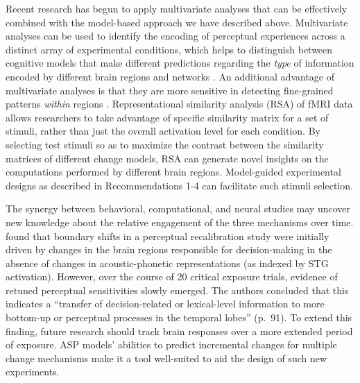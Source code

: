 \documentclass[
  11pt,
  man,floatsintext]{apa6}
\begin{document}
Recent research has begun to apply multivariate analyses that can be effectively combined with the model-based approach we have described above. Multivariate analyses can be used to identify the encoding of perceptual experiences across a distinct array of experimental conditions, which helps to distinguish between cognitive models that make different predictions regarding the \emph{type} of information encoded by different brain regions and networks \autocite[e.g.,][]{blank2016}. An additional advantage of multivariate analyses is that they are more sensitive in detecting fine-grained patterns \emph{within} regions \autocites[e.g.,][]{bonte2017,luthra2020a}. Representational similarity analysis (RSA) of fMRI data allows researchers to take advantage of specific similarity matrix for a set of stimuli, rather than just the overall activation level for each condition. By selecting test stimuli so as to maximize the contrast between the similarity matrices of different change models, RSA can generate novel insights on the computations performed by different brain regions. Model-guided experimental designs as described in Recommendations 1-4 can facilitate such stimuli selection.

The synergy between behavioral, computational, and neural studies may uncover new knowledge about the relative engagement of the three mechanisms over time. \textcite{myers-mesite2014} found that boundary shifts in a perceptual recalibration study were initially driven by changes in the brain regions responsible for decision-making in the absence of changes in acoustic-phonetic representations (as indexed by STG activation). However, over the course of 20 critical exposure trials, evidence of retuned perceptual sensitivities slowly emerged. The authors concluded that this indicates a ``transfer of decision-related or lexical-level information to more bottom-up or perceptual processes in the temporal lobes'' (p.~91). To extend this finding, future research should track brain responses over a more extended period of exposure. ASP models' abilities to predict incremental changes for multiple change mechanisms make it a tool well-suited to aid the design of such new experiments.
\end{document}
